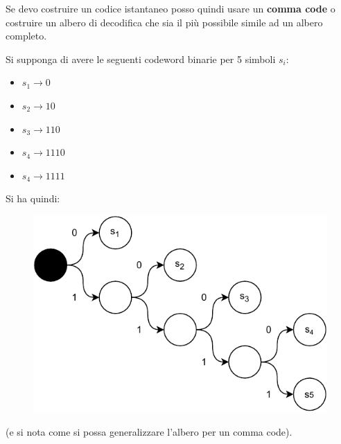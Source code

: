 \documentclass[a4paper,12pt, oneside]{book}
\begin{document}
Se devo costruire un codice istantaneo posso quindi usare un \textbf{comma code}
o costruire un albero di decodifica che sia il più possibile simile ad un albero
completo.
\begin{esempio}
  Si supponga di avere le seguenti codeword binarie per 5 simboli $s_i$:
  \begin{itemize}
    \item $s_1\to 0$
    \item $s_2\to 10$
    \item $s_3\to 110$
    \item $s_4\to 1110$
    \item $s_4\to 1111$
  \end{itemize}
  Si ha quindi:
   \begin{figure}[H]
    \centering
    \includegraphics[scale = 0.8]{img/ct3.pdf}
  \end{figure}
  (e si nota come si possa generalizzare l'albero per un comma code).
\end{esempio}
\end{document}
